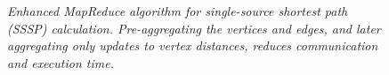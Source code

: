 \begin{figure}[htb]
\begin{center}
{\begin{minipage}{\textwidth}
\begin{tabbing}
  \end{tabbing}
 \end{minipage}}\end{center}

 \caption{\it Enhanced MapReduce algorithm for single-source shortest
 path (SSSP) calculation.  Pre-aggregating the vertices and edges, and
 later aggregating only updates to vertex distances, reduces
 communication and execution time.}

 \label{fig:sssp2}
\end{figure}
